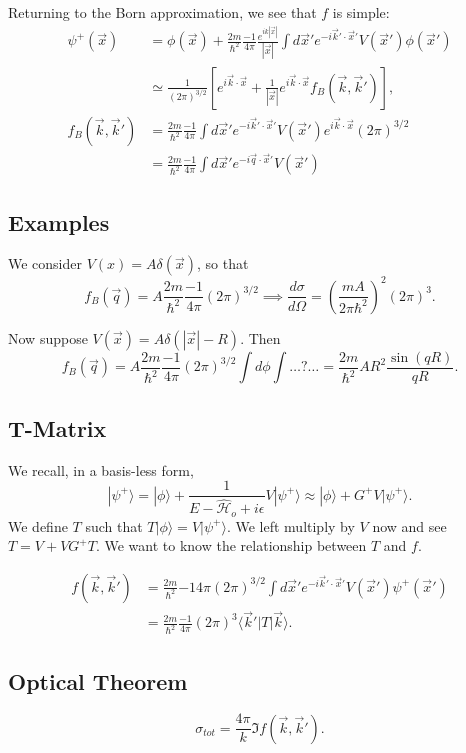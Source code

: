 \documentclass[fontsize=12pt]{scrartcl}
\newcommand{\la}{\langle}
\newcommand{\ra}{\rangle}
\newcommand{\Ham}{\hat{\mathcal{H}}}
\begin{document}
Returning to the Born approximation, we see that $f$ is simple: \begin{align*}
\psi^+(\vec{x})&=\phi(\vec{x})+\frac{2m}{\hbar^2}\frac{-1}{4\pi}\frac{e^{ik|\vec{x}|}}{|\vec{x}|} \int d\vec{x}' e^{-i\vec{k}'\cdot\vec{x}'} V(\vec{x}')\phi(\vec{x}')\\
&\simeq \frac{1}{(2\pi)^{3/2}}\left[e^{i\vec{k}\cdot\vec{x}}+\frac{1}{|\vec{x}|} e^{i\vec{k}\cdot\vec{x}}f_B(\vec{k},\vec{k}')\right],\\
f_B(\vec{k},\vec{k}') &= \frac{2m}{\hbar^2}\frac{-1}{4\pi} \int d\vec{x}' e^{-i\vec{k}'\cdot\vec{x}'}V(\vec{x}')e^{i\vec{k}\cdot\vec{x}}(2\pi)^{3/2}\\ &= \frac{2m}{\hbar^2}\frac{-1}{4\pi} \int d\vec{x}' e^{-i\vec{q}\cdot\vec{x}'}V(\vec{x}')
\end{align*}

\subsection{Examples}

We consider $V(x)=A\delta(\vec{x})$, so that $$f_B(\vec{q}) = A\frac{2m}{\hbar^2}\frac{-1}{4\pi}(2\pi)^{3/2}\implies \frac{d\sigma}{d\Omega} = \left(\frac{mA}{2\pi\hbar^2}\right)^2 (2\pi)^3.$$

Now suppose $V(\vec{x}) = A\delta(|\vec{x}|-R).$ Then $$f_B(\vec{q}) = A\frac{2m}{\hbar^2}\frac{-1}{4\pi}(2\pi)^{3/2}\int d\phi \int \dots ? \dots = \frac{2m}{\hbar^2}AR^2 \frac{\sin(qR)}{qR}.$$ 

\subsection{T-Matrix}

We recall, in a basis-less form, $$|\psi^+\ra = |\phi\ra + \frac{1}{E-\Ham_o+i\epsilon}V|\psi^+\ra\approx |\phi\ra + G^+V|\psi^+\ra.$$ We define $T$ such that $T|\phi\ra = V|\psi^+\ra$. We left multiply by $V$ now and see $T = V+VG^+ T.$ We want to know the relationship between $T$ and $f$.

\begin{align*}
f(\vec{k},\vec{k}')&=\frac{2m}{\hbar^2}{-1}{4\pi}(2\pi)^{3/2}\int d\vec{x}' e^{-i\vec{k}'\cdot\vec{x}'} V(\vec{x}')\psi^+(\vec{x}')\\
&= \frac{2m}{\hbar^2}\frac{-1}{4\pi} (2\pi)^3 \la \vec{k}'|T|\vec{k}\ra.
\end{align*}


\subsection{Optical Theorem}

$$\sigma_{tot}=\frac{4\pi}{k}\Im f(\vec{k},\vec{k}').$$
\end{document}
